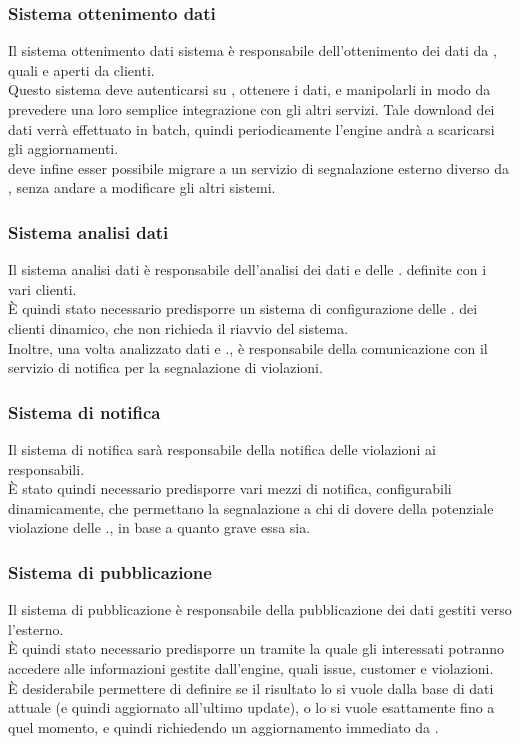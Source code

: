 		\subsubsection{Sistema ottenimento dati} 
			Il sistema ottenimento dati sistema è responsabile dell'ottenimento dei dati da , quali  e  aperti da clienti. \\
			Questo sistema deve autenticarsi su , ottenere i dati, e manipolarli in modo da prevedere una loro semplice integrazione con gli altri servizi.
			Tale download dei dati verrà effettuato in batch, quindi periodicamente l'engine andrà a scaricarsi gli aggiornamenti. \\
			deve infine esser possibile migrare a un servizio di segnalazione esterno diverso da , senza andare a modificare gli altri sistemi.
		\subsubsection{Sistema analisi dati}
			Il sistema analisi dati è responsabile dell'analisi dei dati e delle . definite con i vari clienti. \\
			È quindi stato necessario predisporre un sistema di configurazione delle . dei clienti dinamico, che non richieda il riavvio del sistema. \\
			Inoltre, una volta analizzato dati e ., è responsabile  della comunicazione con il servizio di notifica per la segnalazione di violazioni.
		\subsubsection{Sistema di notifica}
			Il sistema di notifica sarà responsabile della notifica delle violazioni ai responsabili.\\
			È stato quindi necessario predisporre vari mezzi di notifica, configurabili dinamicamente, che permettano la segnalazione a chi di dovere della potenziale violazione delle ., in base a quanto grave essa sia.
		\subsubsection{Sistema di pubblicazione}
			Il sistema di pubblicazione è responsabile della pubblicazione dei dati gestiti verso l'esterno.\\
			È quindi stato necessario predisporre un  tramite la quale gli interessati potranno accedere alle informazioni gestite dall'engine, quali issue, customer e violazioni. \\
			È desiderabile permettere di definire se il risultato lo si vuole dalla base di dati attuale (e quindi aggiornato all'ultimo update), o lo si vuole esattamente fino a quel momento, e quindi richiedendo un aggiornamento immediato da .
		






